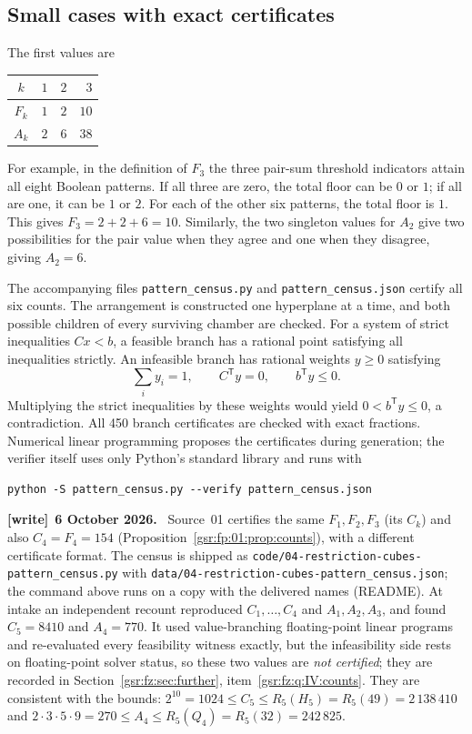\documentclass[11pt,letterpaper]{article}
\numberwithin{equation}{section}
\theoremstyle{definition}
\theoremstyle{remark}
\newcommand{\1}{\mathbf 1}
\newcommand{\file}[1]{\nolinkurl{#1}}
\newenvironment{writenote}[1][]{\par\smallskip\begingroup\small
 \noindent\textbf{[write]}\if\relax\detokenize{#1}\relax\else~\textbf{#1.}\fi\ }%
 {\par\endgroup\smallskip}
\begin{document}
\subsection{Small cases with exact certificates}

The first values are
\begin{center}
\begin{tabular}{c|rrr}
$k$ & $1$ & $2$ & $3$\\\hline
$F_k$ & $1$ & $2$ & $10$\\
$A_k$ & $2$ & $6$ & $38$
\end{tabular}
\end{center}
For example, in the definition of $F_3$ the three pair-sum threshold
indicators attain all eight Boolean patterns. If all three are zero,
the total floor can be $0$ or $1$; if all are one, it can be $1$ or $2$.
For each of the other six patterns, the total floor is $1$. This gives
$F_3=2+2+6=10$. Similarly, the two singleton values for $A_2$ give two
possibilities for the pair value when they agree and one when they
disagree, giving $A_2=6$.

The accompanying files \texttt{pattern\_census.py} and
\texttt{pattern\_census.json} certify all six counts. The arrangement is
constructed one hyperplane at a time, and both possible children of
every surviving chamber are checked. For a system of strict inequalities
$Cx<b$, a feasible branch has a rational point satisfying all inequalities
strictly. An infeasible branch has rational weights $y\ge0$ satisfying
\[
 \sum_i y_i=1,\qquad C^{\mathsf T}y=0,\qquad b^{\mathsf T}y\le0.
\]
Multiplying the strict inequalities by these weights would yield
$0<b^{\mathsf T}y\le0$, a contradiction. All 450 branch certificates are
checked with exact fractions. Numerical linear programming proposes the
certificates during generation; the verifier itself uses only Python's
standard library and runs with
\begin{verbatim}
python -S pattern_census.py --verify pattern_census.json
\end{verbatim}
\begin{writenote}[6 October 2026]
Source~01 certifies the same $F_1,F_2,F_3$ (its $C_k$) and also $C_4=F_4=154$ (Proposition~\ref{gsr:fp:01:prop:counts}), with a different certificate format. The census is shipped as \file{code/04-restriction-cubes-pattern\_census.py} with \file{data/04-restriction-cubes-pattern\_census.json}; the command above runs on a copy with the delivered names (README). At intake an independent recount reproduced $C_1,\ldots,C_4$ and $A_1,A_2,A_3$, and found $C_5=8410$ and $A_4=770$. It used value-branching floating-point linear programs and re-evaluated every feasibility witness exactly, but the infeasibility side rests on floating-point solver status, so these two values are \emph{not certified}; they are recorded in Section~\ref{gsr:fz:sec:further}, item~\ref{gsr:fz:q:IV:counts}. They are consistent with the bounds: $2^{10}=1024\le C_5\le R_5(H_5)=R_5(49)=2\,138\,410$ and $2\cdot3\cdot5\cdot9=270\le A_4\le R_5(Q_4)=R_5(32)=242\,825$.
\end{writenote}
\end{document}
